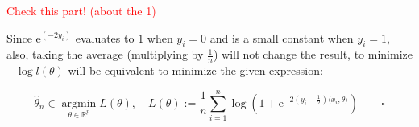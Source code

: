 \documentclass{article}
\begin{document}
\begin{comment}
Thus, we should compute the gradient of the negative $\log$-likelihood w.r.t. $\theta$, set to $0$ and solve for $\theta$
\footnote{Deisenroth, Marc Peter, Faisal, A. Aldo, Ong, Cheng Soon, \textit{Mathematics for Machine Learning}, Cambridge University Press, 2020, pp. 351.}
:

\begin{equation*}
    \begin{split}
        \nabla \left( - \log l(\theta) \right) 
        &= \nabla \left( - \sum_{i=1}^n \left[ - \langle x_i, \theta \rangle(1 - 2y_i) - \log \left( 1 + \mathrm{e}^{-\langle x_i, \theta \rangle} \right) \right] \right) \\
        &= \nabla \left( \sum_{i=1}^n \langle x_i, \theta \rangle(1 - 2y_i)\right) + \nabla \left(\sum_{i=1}^n\log \left( 1 + \mathrm{e}^{-\langle x_i, \theta \rangle} \right)\right) \\
        &= \sum_{i=1}^n \left[ x_i(1 - 2y_i) - x_i \frac{\mathrm{e}^{-\langle x_i, \theta \rangle}}{1 + \mathrm{e}^{-\langle x_i, \theta \rangle}} \right] \\
        &= \sum_{i=1}^n \left[ \frac{x_i(1 - 2y_i)(1 + \mathrm{e}^{-\langle x_i, \theta \rangle})}{(1 + \mathrm{e}^{-\langle x_i, \theta \rangle})} - \frac{x_i \mathrm{e}^{-\langle x_i, \theta \rangle}}{1 + \mathrm{e}^{-\langle x_i, \theta \rangle}} \right] \\
    \end{split}
\end{equation*}
\end{comment}

\textcolor{red}{Check this part! (about the 1)}
\bigskip

Since $\mathrm{e}^{(- 2y_i)}$ evaluates to $1$ when $y_i = 0$ and is a small constant when $y_i = 1$,
also, taking the average (multiplying by $\frac{1}{n}$) will not change the result,
to minimize $- \log l(\theta)$ will be equivalent to minimize the given expression:

\begin{equation*}
\hat{\theta}_n \in \underset{\theta \in \mathbb{R}^p}{\operatorname{argmin}} L ( \theta ), \quad L (\theta) := \frac{1}{n} \sum_{i = 1}^n \log \left( 1 + \mathrm{e}^{-2(y_i - \frac{1}{2})\langle x_i, \theta \rangle} \right) \qquad \square
\end{equation*} 
\end{document}
